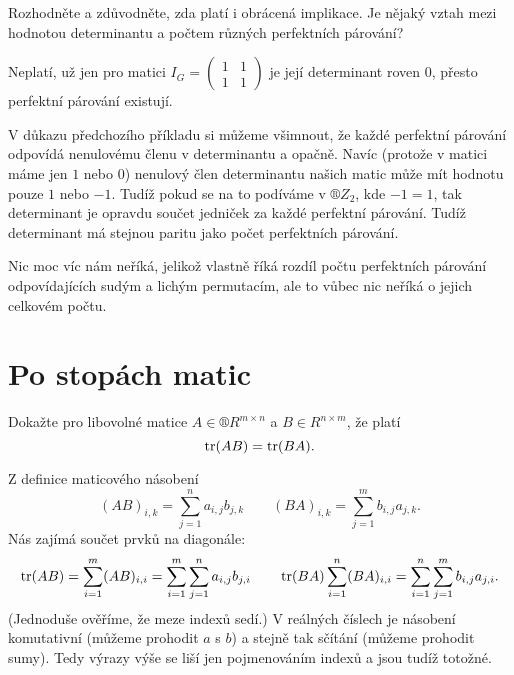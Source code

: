 \documentclass[12pt]{article}					%
\begin{document}
    \begin{priklad}[11.2]
        Rozhodněte a zdůvodněte, zda platí i obrácená implikace. Je nějaký vztah mezi hodnotou determinantu a počtem různých perfektních párování?

        \begin{reseni}
            Neplatí, už jen pro matici $I_G = \begin{pmatrix} 1 & 1 \\ 1 & 1 \end{pmatrix}$ je její determinant roven 0, přesto perfektní párování existují.

            V důkazu předchozího příkladu si můžeme všimnout, že každé perfektní párování odpovídá nenulovému členu v determinantu a opačně. Navíc (protože v matici máme jen $1$ nebo $0$) nenulový člen determinantu našich matic může mít hodnotu pouze $1$ nebo $-1$. Tudíž pokud se na to podíváme v $®Z_2$, kde $-1 = 1$, tak determinant je opravdu součet jedniček za každé perfektní párování. Tudíž determinant má stejnou paritu jako počet perfektních párování.

            Nic moc víc nám neříká, jelikož vlastně říká rozdíl počtu perfektních párování odpovídajících sudým a lichým permutacím, ale to vůbec nic neříká o jejich celkovém počtu.
        \end{reseni}
    \end{priklad}

\pagebreak

\section*{Po stopách matic}
    \begin{priklad}[12.1]
        Dokažte pro libovolné matice $A \in ®R^{m \times n}$ a $B \in R^{n \times m}$, že platí
        $$ \operatorname{tr}(AB) = \operatorname{tr}(BA). $$ 

        \begin{dukazin}
            Z definice maticového násobení
            $$ (AB)_{i, k} = \sum_{j=1}^n a_{i, j}b_{j, k} \qquad (BA)_{i, k} = \sum_{j=1}^m b_{i, j}a_{j, k}. $$
            Nás zajímá součet prvků na diagonále:
            $$ \operatorname{tr}(AB) = \sum_{i=1}^m(AB)_{i, i} = \sum_{i=1}^m\sum_{j=1}^n a_{i, j}b_{j, i} \qquad \operatorname{tr}(BA)\sum_{i=1}^n(BA)_{i, i} = \sum_{i=1}^n\sum_{j=1}^m b_{i, j}a_{j, i}. $$
            (Jednoduše ověříme, že meze indexů sedí.) V reálných číslech je násobení komutativní (můžeme prohodit $a$ s $b$) a stejně tak sčítání (můžeme prohodit sumy). Tedy výrazy výše se liší jen pojmenováním indexů a jsou tudíž totožné.
        \end{dukazin}
    \end{priklad}
\end{document}
